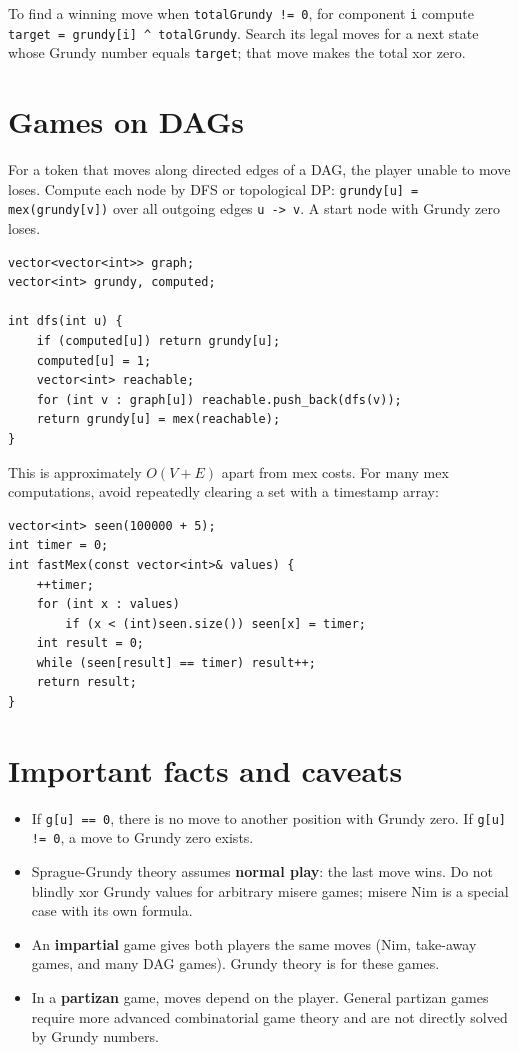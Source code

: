 To find a winning move when \texttt{totalGrundy != 0}, for component \texttt{i} compute \texttt{target = grundy[i] \^{} totalGrundy}. Search its legal moves for a next state whose Grundy number equals \texttt{target}; that move makes the total xor zero.

\section{Games on DAGs}

For a token that moves along directed edges of a DAG, the player unable to move loses. Compute each node by DFS or topological DP: \texttt{grundy[u] = mex(grundy[v])} over all outgoing edges \texttt{u -> v}. A start node with Grundy zero loses.

\begin{lstlisting}
vector<vector<int>> graph;
vector<int> grundy, computed;

int dfs(int u) {
    if (computed[u]) return grundy[u];
    computed[u] = 1;
    vector<int> reachable;
    for (int v : graph[u]) reachable.push_back(dfs(v));
    return grundy[u] = mex(reachable);
}
\end{lstlisting}

This is approximately $O(V+E)$ apart from mex costs. For many mex computations, avoid repeatedly clearing a set with a timestamp array:

\begin{lstlisting}
vector<int> seen(100000 + 5);
int timer = 0;
int fastMex(const vector<int>& values) {
    ++timer;
    for (int x : values)
        if (x < (int)seen.size()) seen[x] = timer;
    int result = 0;
    while (seen[result] == timer) result++;
    return result;
}
\end{lstlisting}

\section{Important facts and caveats}

\begin{itemize}
\item If \texttt{g[u] == 0}, there is no move to another position with Grundy zero. If \texttt{g[u] != 0}, a move to Grundy zero exists.
\item Sprague-Grundy theory assumes \textbf{normal play}: the last move wins. Do not blindly xor Grundy values for arbitrary misere games; misere Nim is a special case with its own formula.
\item An \textbf{impartial} game gives both players the same moves (Nim, take-away games, and many DAG games). Grundy theory is for these games.
\item In a \textbf{partizan} game, moves depend on the player. General partizan games require more advanced combinatorial game theory and are not directly solved by Grundy numbers.
\end{itemize}

